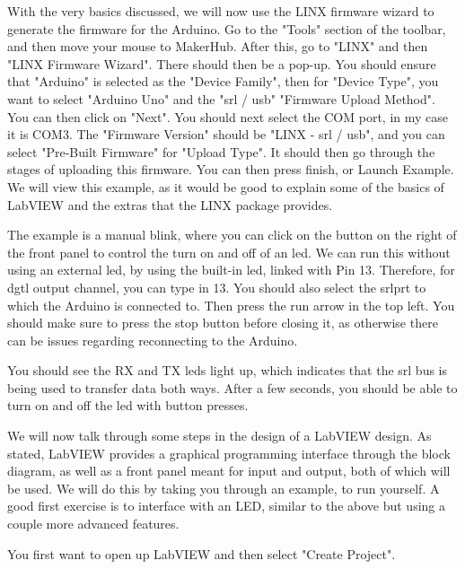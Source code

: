 \documentclass[a4paper,11pt]{report}
\begin{document}
With the very basics discussed, we will now use the LINX firmware wizard to generate the firmware for the Arduino. Go to the "Tools" section of the toolbar, and then move your mouse to MakerHub. After this, go to "LINX" and then "LINX Firmware Wizard". There should then be a pop-up. You should ensure that "Arduino" is selected as the "Device Family", then for "Device Type", you want to select "Arduino Uno" and the "\gls{srl} / \gls{usb}" "Firmware Upload Method". You can then click on "Next". You should next select the COM port, in my case it is COM3. The "Firmware Version" should be "LINX - \gls{srl} / \gls{usb}", and you can select "Pre-Built Firmware" for "Upload Type". It should then go through the stages of uploading this firmware. You can then press finish, or Launch Example. We will view this example, as it would be good to explain some of the basics of LabVIEW and the extras that the LINX package provides.

The example is a manual blink, where you can click on the button on the right of the front panel to control the turn on and off of an \gls{led}. We can run this without using an external \gls{led}, by using the built-in \gls{led}, linked with Pin 13. Therefore, for \gls{dgtl} output channel, you can type in 13. You should also select the \gls{srl}\gls{prt} to which the Arduino is connected to. Then press the run arrow in the top left. You should make sure to press the stop button before closing it, as otherwise there can be issues regarding reconnecting to the Arduino.

You should see the RX and TX \gls{led}s light up, which indicates that the \gls{srl} bus is being used to transfer data both ways. After a few seconds, you should be able to turn on and off the \gls{led} with button presses.



We will now talk through some steps in the design of a LabVIEW design. As stated, LabVIEW provides a graphical programming interface through the block diagram, as well as a front panel meant for input and output, both of which will be used. We will do this by taking you through an example, to run yourself. A good first exercise is to interface with an LED, similar to the above but using a couple more advanced features.

You first want to open up LabVIEW and then select "Create Project".
\end{document}
